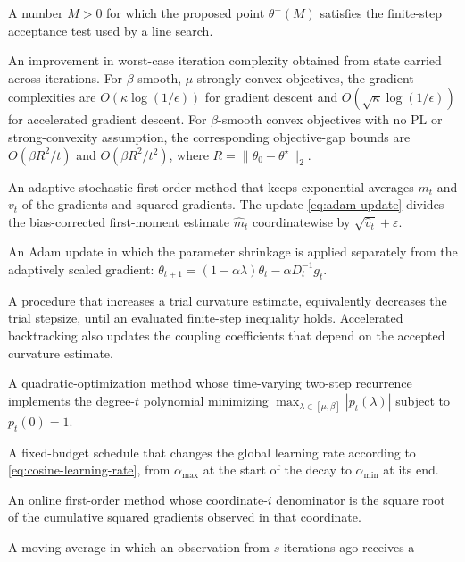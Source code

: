 \documentclass[11pt,twoside]{article}
\theoremstyle{definition}
\theoremstyle{remark}
\begin{document}
\begin{description}[style=nextline,leftmargin=1.5em,labelindent=0pt]
\item[Acceptable curvature estimate]
A number $M>0$ for which the proposed point $\theta^+(M)$ satisfies the
finite-step acceptance test used by a line search.
\item[Acceleration]
An improvement in worst-case iteration complexity obtained from state carried
across iterations. For $\beta$-smooth, $\mu$-strongly convex objectives, the
gradient complexities are $O(\kappa\log(1/\epsilon))$ for gradient descent and
$O(\sqrt\kappa\log(1/\epsilon))$ for accelerated gradient descent. For
$\beta$-smooth convex objectives with no PL or strong-convexity assumption,
the corresponding objective-gap bounds are $O(\beta R^2/t)$ and
$O(\beta R^2/t^2)$, where $R=\|\theta_0-\theta^\star\|_2$.
\item[Adam]
An adaptive stochastic first-order method that keeps exponential averages
$m_t$ and $v_t$ of the gradients and squared gradients. The update
\cref{eq:adam-update} divides the bias-corrected first-moment estimate
$\widehat m_t$ coordinatewise by $\sqrt{\widehat v_t}+\varepsilon$.
\item[AdamW and decoupled weight decay]
An Adam update in which the parameter shrinkage is applied separately from
the adaptively scaled gradient:
$\theta_{t+1}=(1-\alpha\lambda)\theta_t-\alpha D_t^{-1}g_t$.
\item[Backtracking line search]
A procedure that increases a trial curvature estimate, equivalently decreases
the trial stepsize, until an evaluated finite-step inequality holds.
Accelerated backtracking also updates the coupling coefficients that depend on
the accepted curvature estimate.
\item[Chebyshev semi-iteration]
A quadratic-optimization method whose time-varying two-step recurrence
implements the degree-$t$ polynomial minimizing
$\max_{\lambda\in[\mu,\beta]}|p_t(\lambda)|$ subject to $p_t(0)=1$.
\item[Cosine learning-rate decay]
A fixed-budget schedule that changes the global learning rate according to
\cref{eq:cosine-learning-rate}, from $\alpha_{\max}$ at the start of the
decay to $\alpha_{\min}$ at its end.
\item[Diagonal AdaGrad]
An online first-order method whose coordinate-$i$ denominator is the square
root of the cumulative squared gradients observed in that coordinate.
\item[Exponential memory]
A moving average in which an observation from $s$ iterations ago receives a

\end{description}
\end{document}
